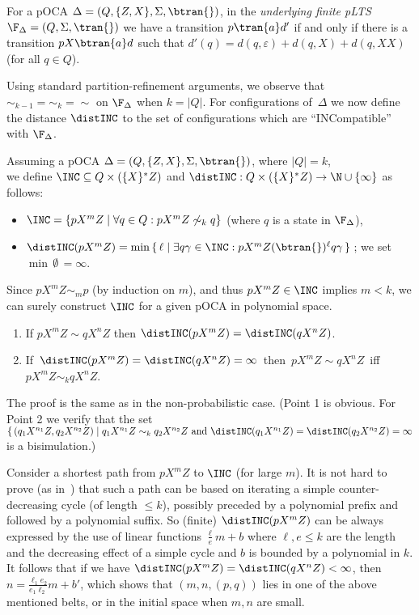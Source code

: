 \begin{definition}\label{D underlying}
For a pOCA
$\Delta=(Q,\{Z,X\},\Sigma,\mathord{\btran{}})$,
in the {\em underlying finite pLTS}
$\F_\Delta=(Q,\Sigma,\tran{})$ we have
a transition $p\tran{a}d'$ if and only if there is a transition $pX\btran{a}d$
such that $d'(q)=d(q,\varepsilon)+d(q,X)+d(q,XX)$ (for all
$q\in Q$).
\end{definition}
Using standard partition-refinement arguments, we observe
that $\sim_{k-1}=\sim_k=\sim$ on $\F_{\Delta}$ when $k=|Q|$.
For configurations of~$\Delta$ we now define the distance
$\distINC$ to the set of configurations which are
``INCompatible'' with $\F_{\Delta}$.
\begin{definition}
Assuming a pOCA
$\Delta=(Q,\{Z,X\},\Sigma,\btran{})$, where $|Q|=k$,
\\
we define $\INC\subseteq Q\times (\{X\}^* Z)$ and
$\distINC:Q\times  (\{X\}^* Z) \rightarrow\N\cup\{\infty\}$ as follows:
\begin{itemize}
\item
$\INC=\{pX^mZ\mid \forall q\in Q:pX^mZ\not\sim_k  q\}$ (where $q$
is a state in $\F_{\Delta}$),
\item
$\distINC(pX^mZ)=\min\,\{\,\ell\mid\exists q\gamma\in\INC:
pX^mZ(\btran{})^\ell q\gamma \,\}$\,;
we set $\min\,\emptyset\,=\infty$.
\end{itemize}
\end{definition}
Since $pX^mZ\sim_m p$ (by induction on $m$), and thus
$pX^mZ\in\INC$ implies
$m<k$,
we can surely construct $\INC$ for a given pOCA in polynomial space.


\begin{proposition}
\label{L nonreachable}
\hfill
\begin{enumerate}
\item
If $pX^mZ\sim qX^nZ$ then $\distINC(pX^mZ)=\distINC(qX^nZ)$.
\item
\mbox{If $\distINC(pX^mZ)=\distINC(qX^nZ)=\infty$
then
$pX^mZ\sim qX^nZ$ iff $pX^mZ\sim_k qX^nZ$.}
\end{enumerate}
\end{proposition}
The proof is the same as in the non-probabilistic case.
(Point 1 is obvious. For Point 2 we verify that the set
$\{\,(q_1X^{n_1}Z,q_2X^{n_2}Z)\mid q_1X^{n_1}Z\sim_k
q_2X^{n_2}Z\text{ and } \distINC(q_1X^{n_1}Z) = \distINC(q_2X^{n_2}Z) = \infty$
is a bisimulation.)

Consider a shortest path from $pX^{m}Z$ to $\INC$ (for large $m$).
It is not hard to prove (as in~\cite[Lemma 10]{BGJ:Concur10}) that such a path can be based on iterating
a simple counter-decreasing cycle (of length
$\leq k$), possibly preceded by a polynomial prefix and followed by a
polynomial suffix.
So (finite) $\distINC(pX^{m}Z)$ can be always expressed
by the use of linear functions $\frac{\ell}{e}m+b$ where
$\ell, e\leq k$ are the length and the decreasing effect of a simple
cycle and $b$ is bounded by a polynomial in $k$.
It follows that if we have $\distINC(pX^{m}Z)=\distINC(qX^{n}Z)<\infty$,
then $n=\frac{\ell_1e_2}{e_1\ell_2}m+b'$,
which shows that
$(m,n,(p,q))$ lies in one of the above mentioned belts, or in the
initial space when $m,n$ are small.



